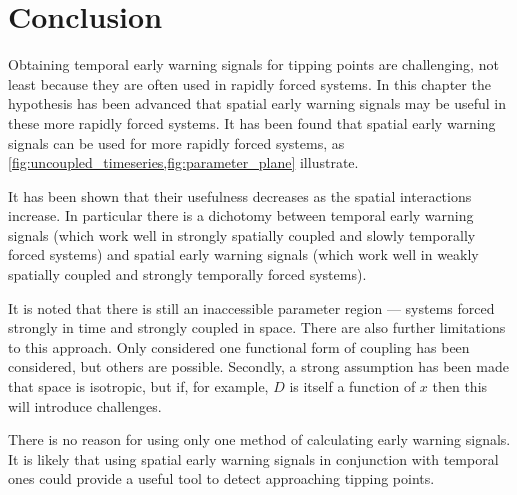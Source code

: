 \section{Conclusion}

Obtaining temporal early warning signals for tipping points are challenging, not least because they are often used in rapidly forced systems.
In this chapter the hypothesis has been advanced that spatial early warning signals may be useful in these more rapidly forced systems.
It has been found that spatial early warning signals can be used for more rapidly forced systems, as \cref{fig:uncoupled_timeseries,fig:parameter_plane}
illustrate.

It has been shown that their usefulness decreases as the spatial interactions increase.
In particular there is a dichotomy between temporal early warning signals (which work well in strongly spatially coupled and slowly temporally forced systems)
and spatial early warning signals (which work well in weakly spatially coupled and strongly temporally forced systems).

It is noted that there is still an inaccessible parameter region --- systems forced strongly in time and strongly coupled in space. There are also further limitations
to this approach.  Only considered one functional form of coupling has been considered, but others are possible. Secondly, a strong assumption has been made that space is isotropic,
but if, for example, $D$ is itself a function of $x$ then this will introduce challenges.

There is no reason for using only one method of calculating early warning signals. It is likely that using spatial early warning signals in conjunction with
temporal ones could provide a useful tool to detect approaching tipping points.